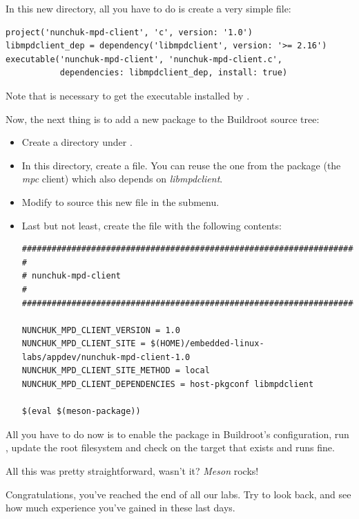 In this new directory, all you have to do is create a very simple
 file:

\begin{verbatim}
project('nunchuk-mpd-client', 'c', version: '1.0')
libmpdclient_dep = dependency('libmpdclient', version: '>= 2.16')
executable('nunchuk-mpd-client', 'nunchuk-mpd-client.c',
           dependencies: libmpdclient_dep, install: true)
\end{verbatim}

Note that  is necessary to get the executable installed
by .

Now, the next thing is to add a new package to the Buildroot source
tree:
\begin{itemize}
\item Create a  directory under .
\item In this directory, create a  file. You can reuse
      the one from the  package (the {\em mpc} client)
      which also depends on {\em libmpdclient}.
\item Modify  to source this new file in the
       submenu.
\item Last but not least, create the  file
      with the following contents:
\begin{verbatim}
################################################################################
#
# nunchuk-mpd-client
#
################################################################################

NUNCHUK_MPD_CLIENT_VERSION = 1.0
NUNCHUK_MPD_CLIENT_SITE = $(HOME)/embedded-linux-labs/appdev/nunchuk-mpd-client-1.0
NUNCHUK_MPD_CLIENT_SITE_METHOD = local
NUNCHUK_MPD_CLIENT_DEPENDENCIES = host-pkgconf libmpdclient

$(eval $(meson-package))
\end{verbatim}
\end{itemize}

All you have to do now is to enable the 
package in Buildroot's configuration, run , update the root
filesystem and check on the target that
 exists and runs fine.

All this was pretty straightforward, wasn't it? {\em Meson} rocks!

Congratulations, you've reached the end of all our labs. Try to look
back, and see how much experience you've gained in these last days.
